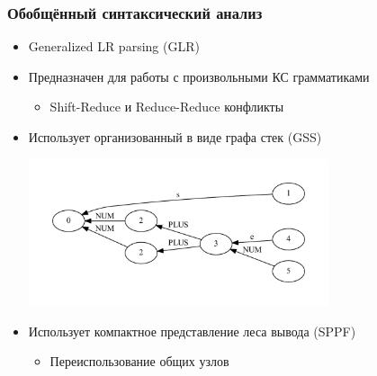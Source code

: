\documentclass{beamer}
\begin{document}
\begin{frame}[fragile]
	\transwipe[direction=90]
	\frametitle{Обобщённый синтаксический анализ}
    \begin{itemize}
    	\item Generalized LR parsing (GLR)
    	\item Предназначен для работы с произвольными КС грамматиками
	    \begin{itemize}
    	    \item Shift-Reduce и Reduce-Reduce конфликты
    	\end{itemize}
    	\item Использует организованный в виде графа стек (GSS)
	        \begin{center}
	            \includegraphics[width=250pt]{picts/stack.pdf}
	        \end{center}
    	\item Использует компактное представление леса вывода (SPPF)
	        \begin{itemize}
	            \item Переиспользование общих узлов
	        \end{itemize}
	\end{itemize}
\end{frame}
\end{document}
